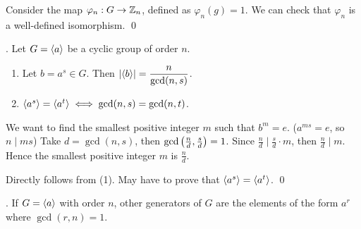  Consider the map \(\varphi_n: G \rightarrow \mathbb{Z}_n\), defined as \(\varphi_n(g) = 1\). We can check that \(\varphi_n\) is a well-defined isomorphism. \qed

\thm. Let \(G = \left\langle a \right\rangle\) be a cyclic group of order \(n\).
\begin{enumerate}
    \item Let \(b = a^s \in G\). Then \(\left| \left\langle b \right\rangle \right| = \dfrac{n}{\gcd(n, s)}\).
    \item \(\left\langle a^s \right\rangle = \left\langle a^t \right\rangle \iff \gcd(n, s) = \gcd(n, t)\).
\end{enumerate}

\pf
{} We want to find the smallest positive integer \(m\) such that \(b^m = e\). (\(a^{ms} = e\), so \(n \mid ms\)) Take \(d = \gcd(n, s)\), then \(\gcd\left( \frac{n}{d}, \frac{s}{d} \right) = 1\). Since \(\frac{n}{d} \mid \frac{s}{d}\cdot m\), then \(\frac{n}{d} \mid m\). Hence the smallest positive integer \(m\) is \(\frac{n}{d}\).

 Directly follows from (1). May have to prove that \(\left\langle a^s \right\rangle = \left\langle a^t \right\rangle\). \qed

\cor. If \(G = \left\langle a \right\rangle\) with order \(n\), other generators of \(G\) are the elements of the form \(a^r\) where \(\gcd(r, n) = 1\).

\pagebreak
